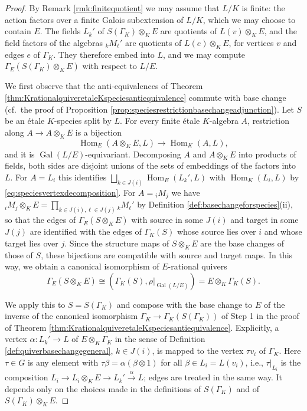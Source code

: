 \documentclass[a4paper,12pt,reqno]{amsart}
\DeclareMathOperator{\Hom}{\mathrm{Hom}}
\DeclareMathOperator{\Gal}{\mathrm {Gal}}
\theoremstyle{plain}
\theoremstyle{remark}
\begin{document}
  \begin{proof}
    By Remark \ref{rmk:finitequotient} we may assume that $L/K$ is finite: the action factors over a finite Galois subextension of $L/K$, which we may choose to contain $E$. The fields $L_k'$ of $S(\Gamma_K)\otimes_KE$ are quotients of $L(v)\otimes_KE$, and the field factors of the algebras ${}_kM_\ell'$ are quotients of $L(e)\otimes_KE$, for vertices $v$ and edges $e$ of $\Gamma_K$. They therefore embed into $L$, and we may compute $\Gamma_E(S(\Gamma_K)\otimes_KE)$ with respect to $L/E$.

    We first observe that the anti-equivalences of Theorem \ref{thm:KrationalquiveretaleKspeciesantiequivalence} commute with base change (cf.\ the proof of Proposition \ref{prop:speciesrestrictionbasechangeadjunction}). Let $S$ be an \'etale $K$-species split by $L$. For every finite \'etale $K$-algebra $A$, restriction along $A\to A\otimes_KE$ is a bijection
    \[
    \Hom_E(A\otimes_KE,L)\to\Hom_K(A,L),
    \]
    and it is $\Gal(L/E)$-equivariant. Decomposing $A$ and $A\otimes_KE$ into products of fields, both sides are disjoint unions of the sets of embeddings of the factors into $L$. For $A=L_i$ this identifies $\bigsqcup_{k\in J(i)}\Hom_E(L_k',L)$ with $\Hom_K(L_i,L)$ by \eqref{eq:speciesvertexdecomposition}. For $A={}_iM_j$ we have ${}_iM_j\otimes_KE=\prod_{k\in J(i),\ell\in J(j)}{}_kM_\ell'$ by Definition \ref{def:basechangeforspecies}(ii), so that the edges of $\Gamma_E(S\otimes_KE)$ with source in some $J(i)$ and target in some $J(j)$ are identified with the edges of $\Gamma_K(S)$ whose source lies over $i$ and whose target lies over $j$. Since the structure maps of $S\otimes_KE$ are the base changes of those of $S$, these bijections are compatible with source and target maps. In this way, we obtain a canonical isomorphism of $E$-rational quivers
    \[
    \Gamma_E(S\otimes_KE)\cong\left(\Gamma_K(S),\rho|_{\Gal(L/E)}\right)=E\otimes_K\Gamma_K(S).
    \]

    We apply this to $S=S(\Gamma_K)$ and compose with the base change to $E$ of the inverse of the canonical isomorphism $\Gamma_K\to\Gamma_K(S(\Gamma_K))$ of Step 1 in the proof of Theorem \ref{thm:KrationalquiveretaleKspeciesantiequivalence}. Explicitly, a vertex $\alpha\colon L_k'\to L$ of $E\otimes_K\Gamma_K$ in the sense of Definition \ref{def:quiverbasechangegeneral}, $k\in J(i)$, is mapped to the vertex $\tau v_i$ of $\Gamma_K$. Here $\tau\in G$ is any element with $\tau\beta=\alpha(\beta\otimes1)$ for all $\beta\in L_i=L(v_i)$, i.e., $\tau|_{L_i}$ is the composition $L_i\to L_i\otimes_KE\to L_k'\xrightarrow{\alpha}L$; edges are treated in the same way. It depends only on the choices made in the definitions of $S(\Gamma_K)$ and of $S(\Gamma_K)\otimes_KE$.
  \end{proof}
\end{document}
